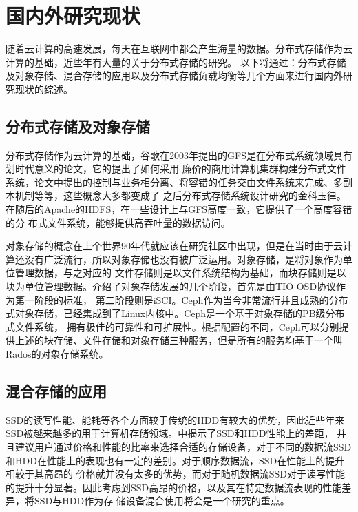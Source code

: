 
\chapter{国内外研究现状}
\label{chap:relatedwork}
随着云计算的高速发展，每天在互联网中都会产生海量的数据。分布式存储作为云计算的基础，近些年有大量的关于分布式存储的研究。
以下将通过：分布式存储及对象存储、混合存储的应用以及分布式存储负载均衡等几个方面来进行国内外研究现状的综述。

\section{分布式存储及对象存储}
分布式存储作为云计算的基础，谷歌在2003年提出的GFS\cite{ghemawat2003google}是在分布式系统领域具有划时代意义的论文，它的提出了如何采用
廉价的商用计算机集群构建分布式文件系统，论文中提出的控制与业务相分离、将容错的任务交由文件系统来完成、多副本机制等等，这些概念大多都变成了
之后分布式存储系统设计研究的金科玉律。在随后的Apache的HDFS\cite{shvachko2010hadoop}，在一些设计上与GFS高度一致，它提供了一个高度容错的分
布式文件系统，能够提供高吞吐量的数据访问。

对象存储的概念在上个世界90年代就应该在研究社区中出现，但是在当时由于云计算还没有广泛流行，所以对象存储也没有被广泛运用。对象存储，是将对象作为单位管理数据，与之对应的
文件存储则是以文件系统结构为基础，而块存储则是以块为单位管理数据。介绍了对象存储发展的几个阶段，首先是由TIO OSD协议作为第一阶段的标准，
第二阶段则是iSCI。Ceph\cite{weil2006ceph}作为当今非常流行并且成熟的分布式对象存储，已经集成到了Linux内核中。Ceph是一个基于对象存储的PB级分布式文件系统，
拥有极佳的可靠性和可扩展性。根据配置的不同，Ceph可以分别提供上述的块存储、文件存储和对象存储三种服务，但是所有的服务均基于一个叫Rados的对象存储系统。

\section{混合存储的应用}
SSD的读写性能、能耗等各个方面较于传统的HDD有较大的优势，因此近些年来SSD被越来越多的用于计算机存储领域。中揭示了SSD和HDD性能上的差距，
并且建议用户通过价格和性能的比率来选择合适的存储设备，对于不同的数据流SSD和HDD在性能上的表现也有一定的差别。对于顺序数据流，SSD在性能上的提升相较于其高昂的
价格就并没有太多的优势，而对于随机数据流SSD对于读写性能的提升十分显著。因此考虑到SSD高昂的价格，以及其在特定数据流表现的性能差异，将SSD与HDD作为存
储设备混合使用将会是一个研究的重点。

